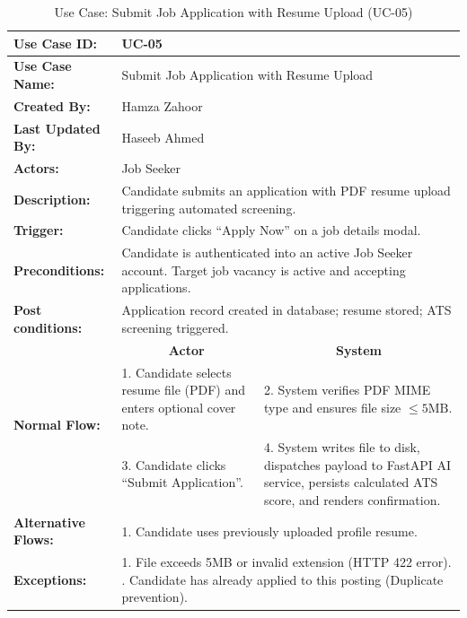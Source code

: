 \begin{table}[H]
\centering
\small
\caption{Use Case: Submit Job Application with Resume Upload (UC-05)}
\label{tab:uc05_spec}
\begin{tabular}{|p{3.2cm}|p{5.5cm}|p{5.5cm}|}
\hline
\textbf{Use Case ID:} & \multicolumn{2}{p{11.4cm}|}{UC-05} \\ \hline
\textbf{Use Case Name:} & \multicolumn{2}{p{11.4cm}|}{Submit Job Application with Resume Upload} \\ \hline
\textbf{Created By:} & \multicolumn{2}{p{11.4cm}|}{Hamza Zahoor} \\ \hline
\textbf{Last Updated By:} & \multicolumn{2}{p{11.4cm}|}{Haseeb Ahmed} \\ \hline
\textbf{Actors:} & \multicolumn{2}{p{11.4cm}|}{Job Seeker} \\ \hline
\textbf{Description:} & \multicolumn{2}{p{11.4cm}|}{Candidate submits an application with PDF resume upload triggering automated screening.} \\ \hline
\textbf{Trigger:} & \multicolumn{2}{p{11.4cm}|}{Candidate clicks ``Apply Now'' on a job details modal.} \\ \hline
\textbf{Preconditions:} & \multicolumn{2}{p{11.4cm}|}{Candidate is authenticated into an active Job Seeker account. \newline Target job vacancy is active and accepting applications.} \\ \hline
\textbf{Post conditions:} & \multicolumn{2}{p{11.4cm}|}{Application record created in database; resume stored; ATS screening triggered.} \\ \hline
\multirow{3}{*}{\textbf{Normal Flow:}} & \multicolumn{1}{c|}{\textbf{Actor}} & \multicolumn{1}{c|}{\textbf{System}} \\ \cline{2-3}
& 1. Candidate selects resume file (PDF) and enters optional cover note. & 2. System verifies PDF MIME type and ensures file size $\le 5\text{MB}$. \vspace{2pt} \\
& 3. Candidate clicks ``Submit Application''. & 4. System writes file to disk, dispatches payload to FastAPI AI service, persists calculated ATS score, and renders confirmation. \\ \hline
\textbf{Alternative Flows:} & \multicolumn{2}{p{11.4cm}|}{1. Candidate uses previously uploaded profile resume.} \\ \hline
\textbf{Exceptions:} & \multicolumn{2}{p{11.4cm}|}{1. File exceeds 5MB or invalid extension (HTTP 422 error). \newline 2. Candidate has already applied to this posting (Duplicate prevention).} \\ \hline
\end{tabular}
\end{table}

